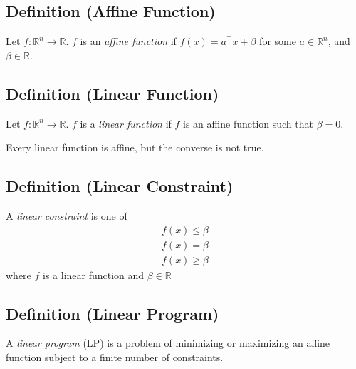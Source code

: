 \begin{defbox}
    \subsection{Definition (Affine Function)}
    Let $f:\mathbb{R}^n\rightarrow\mathbb{R}$. $f$ is an \emph{affine function} if
    $f(x)=a^\top x+\beta$ for some $a\in\mathbb{R}^n$, and $\beta\in\mathbb{R}$.    
\end{defbox}

\begin{defbox}
    \subsection{Definition (Linear Function)}
    Let $f:\mathbb{R}^n\rightarrow\mathbb{R}$. $f$ is a \emph{linear function} if
    $f$ is an affine function such that $\beta=0$.
\end{defbox}

\begin{remark}
    Every linear function is affine, but the converse is not true.
\end{remark}

\begin{defbox}
    \subsection{Definition (Linear Constraint)}
    A \emph{linear constraint} is one of
    \begin{align*}
        f(x)\le \beta\\
        f(x)=\beta\\
        f(x)\ge \beta
    \end{align*}
    where $f$ is a linear function and $ \beta\in\mathbb{R} $
\end{defbox}

\begin{defbox}
    \subsection{Definition (Linear Program)}
    A \emph{linear program} (LP) is a problem of minimizing or
    maximizing an affine function subject to a finite number
    of constraints.
\end{defbox}